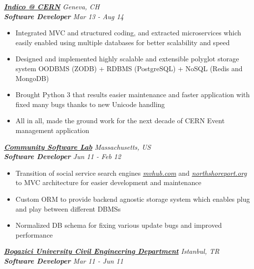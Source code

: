 \documentclass[line, margin]{res}
\begin{document}
\begin{resume}
\begin{itemize}
\end{itemize}

{\sl \textbf{\href{http://indico-software.org/}{Indico @ CERN}} \hfill Geneva, CH} \\
{\sl \textbf{Software Developer} \hfill Mar 13 - Aug 14} \\

\vspace{-0.3cm}
\begin{itemize} \itemsep -3pt
	\vspace{-.2cm}
	\item Integrated MVC and structured coding, and extracted microservices which easily enabled using multiple databases for better scalability and speed
	\item Designed and implemented highly scalable and extensible polyglot storage system OODBMS (ZODB) + RDBMS (PostgreSQL) + NoSQL (Redis and MongoDB)
	\item Brought Python 3 that results easier maintenance and faster application with fixed many bugs thanks to new Unicode handling
	\item All in all, made the ground work for the next decade of CERN Event management application
\end{itemize}

{\sl \textbf{\href{https://launchpad.net/mvhub}{Community Software Lab}} \hfill Massachusetts, US} \\
{\sl \textbf{Software Developer} \hfill Jun 11 - Feb 12} \\

\vspace{-0.3cm}
\begin{itemize} \itemsep -3pt
	\vspace{-.2cm}
	\item Transition of social service search engines \textit{\href{http://mvhub.com/}{mvhub.com}} and \textit{\href{http://northshoreport.org/}{northshoreport.org}} to MVC architecture for easier development and maintenance
	\item Custom ORM to provide backend agnostic storage system which enables plug and play between different DBMSs
	\item Normalized DB schema for fixing various update bugs and improved performance
\end{itemize}

{\sl \textbf{\href{http://www.ce.boun.edu.tr/}{Bogazici University Civil Engineering Department}} \hfill Istanbul, TR} \\
{\sl \textbf{Software Developer} \hfill Mar 11 - Jun 11} \\


\end{resume}
\end{document}
